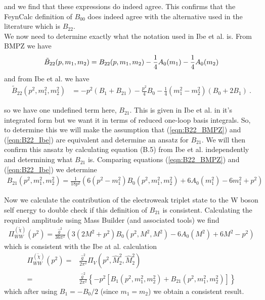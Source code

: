\documentclass[11pt]{article}
\begin{document}
and we find that these expressions do indeed agree.  This confirms that the FeynCalc definition of $B_{00}$ does indeed agree with the alternative used in the literature which is $B_{22}$.\\

We now need to determine exactly what the notation used in Ibe et al. is.  From BMPZ we have
\begin{align}
 \tilde
B_{22}(p,m_1,m_2)= B_{22}(p,m_1,m_2) - {1\over4}A_0(m_1) -
{1\over4}A_0(m_2) \label{eqn:B22_BMPZ}
\end{align}
and from Ibe et al. we have
\begin{align}
{\tilde B}_{22}(p^2, m_1^2, m_2^2) &=
- p^2 (B_1 + B_{21}) - \frac{p^2}{4} B_0 - \frac{1}{4}(m_1^2 - m_2^2) (B_0 + 2B_1)\ . \label{eqn:B22_Ibe}
\end{align}

so we have one undefined term here, $B_{21}$.  This is given in Ibe et al. in it's integrated form but we want it in terms of reduced one-loop basis integrals.  So, to determine this we will make the assumption that (\ref{eqn:B22_BMPZ}) and (\ref{eqn:B22_Ibe}) are equivalent and determine an ansatz for $B_{21}$.  We will then confirm this ansatz by calculating equation (B.5) from Ibe et al. independently and determining what $B_{21}$ is.  Comparing equations (\ref{eqn:B22_BMPZ}) and (\ref{eqn:B22_Ibe}) we determine
\begin{align}
B_{21}(p^2, m_1^2, m_2^2)  = \frac{1}{18 p^2} \left( 6 (p^2-m_1^2)B_0(p^2, m_1^2, m_2^2) +6A_0(m_1^2)-6m_1^2+p^2\right)
\end{align}

Now we calculate the contribution of the electroweak triplet state to the W boson self energy to double check if this definition of $B_{21}$ is consistent.  Calculating the required amplitude using Mass Builder (and associated tools) we find
\begin{align}
\Pi_{WW}^{(\tilde{\chi})}(p^2) =
\frac{\hat{g}^2}{36\pi^2} \left( 3 (2M^2+p^2)B_0(p^2,M^2,M^2)-6A_0(M^2)+6M^2-p^2\right)
\end{align}
which is consistent with the Ibe at al. calculation
\begin{align}
\Pi_{WW}^{(\tilde{\chi})}(p^2) = &
\frac{\hat{g}^2}{2\pi^2}
\Pi_V(p^2, \hat{M}_2^2, \hat{M}_2^2)\\
=& \frac{\hat{g}^2}{2\pi^2} \left\{-p^2 \left[ B_1(p^2,m_1^2,m_2^2)+B_{21}(p^2,m_1^2,m_2^2)\right]\right\}
\end{align}
which after using $B_1 = -B_0/2$ (since $m_1=m_2$) we obtain a consistent result.
\end{document}
